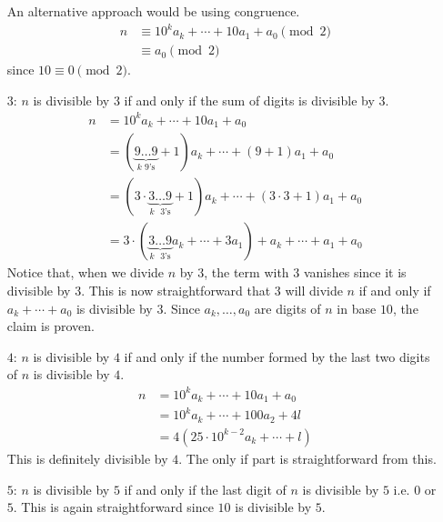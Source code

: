 \documentclass[problems.tex]{subfile}
\begin{document}
\begin{solution}
\begin{enumerate}
					An alternative approach would be using congruence.
						\begin{align*}
							n & \equiv10^ka_k+\cdots+10a_1+a_0\pmod2\\
							  & \equiv a_0\pmod2
						\end{align*}
					since $10\equiv0\pmod2$.
				\item[$3$:] $n$ is divisible by $3$ if and only if the sum of digits is divisible by $3$.
					\begin{align*}
						n & = 10^ka_k+\cdots+10a_1+a_0\\
						  & = (\underbrace{9\ldots9}_\text{$k$ 9's}+1)a_k+\cdots+(9+1)a_1+a_0\\
						  & = (3\cdot\underbrace{3\ldots9}_\text{$k$ $3$'s}+1)a_k+\cdots+(3\cdot3+1)a_1+a_0\\
						  & = 3\cdot\left(\underbrace{3\ldots9}_\text{$k$ $3$'s}a_k+\cdots+3a_1\right)+a_k+\cdots+a_1+a_0
					\end{align*}
				Notice that, when we divide $n$ by $3$, the term with $3$ vanishes since it is divisible by $3$. This is now straightforward that $3$ will divide $n$ if and only if $a_k+\cdots+a_0$ is divisible by $3$. Since $a_k,\ldots,a_0$ are digits of $n$ in base $10$, the claim is proven.
				\item[$4$:] $n$ is divisible by $4$ if and only if the number formed by the last two digits of $n$ is divisible by $4$.
					\begin{align*}
						n & = 10^ka_k+\cdots+10a_1+a_0\\
						  & = 10^ka_k+\cdots+100a_2+4l\\
						  & = 4\left(25\cdot10^{k-2}a_k+\cdots+l\right)
					\end{align*}
				This is definitely divisible by $4$. The only if part is straightforward from this.
				\item[$5$:] $n$ is divisible by $5$ if and only if the last digit of $n$ is divisible by $5$ i.e. $0$ or $5$. This is again straightforward since $10$ is divisible by $5$.
			\end{enumerate}
	\end{solution}
	
\end{document}
